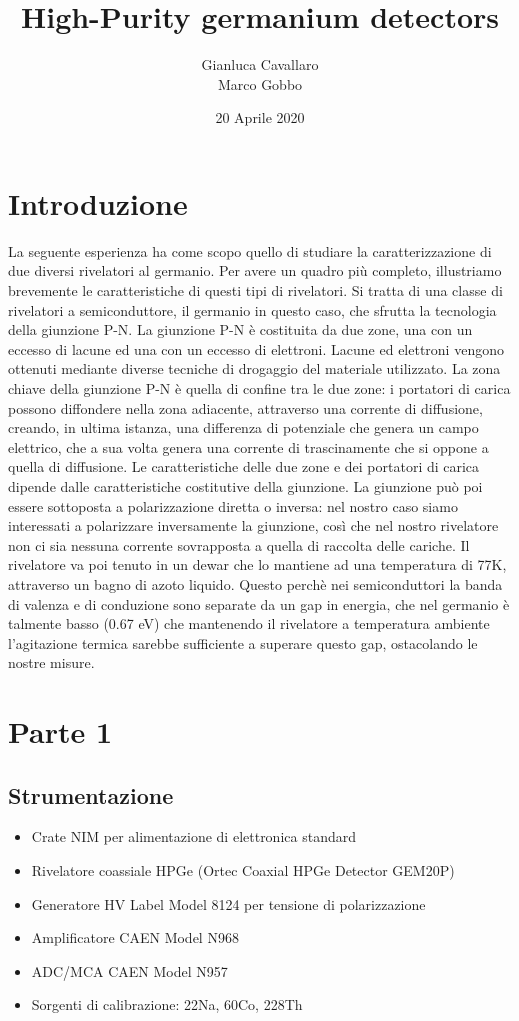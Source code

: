 \documentclass[a4paper,10pt]{article}
\title{High-Purity germanium detectors}
\author{Gianluca Cavallaro \\ Marco Gobbo}
\date{20 Aprile 2020}
\begin{document}
\maketitle


\section{Introduzione}
La seguente esperienza ha come scopo quello di studiare la caratterizzazione di due diversi rivelatori al germanio. Per avere un quadro pi\`u completo, illustriamo brevemente le caratteristiche di questi tipi di rivelatori. Si tratta di una classe di rivelatori a semiconduttore, il germanio in questo caso, che sfrutta la tecnologia della giunzione P-N. La giunzione P-N \`e costituita da due zone, una con un eccesso di lacune ed una con un eccesso di elettroni. Lacune ed elettroni vengono ottenuti mediante diverse tecniche di drogaggio del materiale utilizzato. La zona chiave della giunzione P-N \`e quella di confine tra le due zone: i portatori di carica possono diffondere nella zona adiacente, attraverso una corrente di diffusione, creando, in ultima istanza, una differenza di potenziale che genera un campo elettrico, che a sua volta genera una corrente di trascinamente che si oppone a quella di diffusione. Le caratteristiche delle due zone e dei portatori di carica dipende dalle caratteristiche costitutive della giunzione. La giunzione pu\`o poi essere sottoposta a polarizzazione diretta o inversa: nel nostro caso siamo interessati a polarizzare inversamente la giunzione, cos\`i che nel nostro rivelatore non ci sia nessuna corrente sovrapposta a quella di raccolta delle cariche. Il rivelatore va poi tenuto in un dewar che lo mantiene ad una temperatura di 77K, attraverso un bagno di azoto liquido. Questo perch\`e nei semiconduttori la banda di valenza e di conduzione sono separate da un gap in energia, che nel germanio \`e talmente basso (0.67 eV) che mantenendo il rivelatore a temperatura ambiente l'agitazione termica sarebbe sufficiente a superare questo gap, ostacolando le nostre misure.
\section{Parte 1}


\subsection{Strumentazione}
\begin{itemize}
\item Crate NIM per alimentazione di elettronica standard
\item Rivelatore coassiale HPGe (Ortec Coaxial HPGe Detector GEM20P)
\item Generatore HV Label Model 8124 per tensione di polarizzazione
\item Amplificatore CAEN Model N968
\item ADC/MCA CAEN Model N957
\item Sorgenti di calibrazione: 22Na, 60Co, 228Th
\end{itemize}
\end{document}
